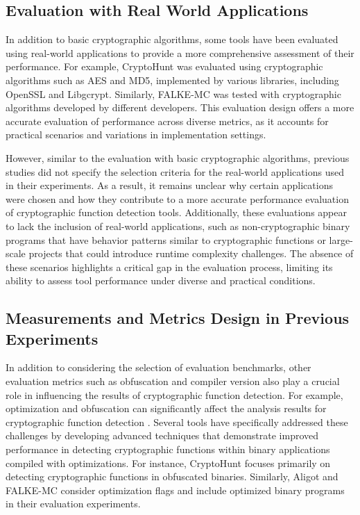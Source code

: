 \subsection{Evaluation with Real World Applications}
In addition to basic cryptographic algorithms, some tools have been evaluated using real-world applications to provide a more comprehensive assessment of their performance. For example, CryptoHunt was evaluated using cryptographic algorithms such as AES and MD5, implemented by various libraries, including OpenSSL and Libgcrypt. Similarly, FALKE-MC was tested with cryptographic algorithms developed by different developers. This evaluation design offers a more accurate evaluation of performance across diverse metrics, as it accounts for practical scenarios and variations in implementation settings.

However, similar to the evaluation with basic cryptographic algorithms, previous studies did not specify the selection criteria for the real-world applications used in their experiments. As a result, it remains unclear why certain applications were chosen and how they contribute to a more accurate performance evaluation of cryptographic function detection tools. Additionally, these evaluations appear to lack the inclusion of real-world applications, such as non-cryptographic binary programs that have behavior patterns similar to cryptographic functions or large-scale projects that could introduce runtime complexity challenges. The absence of these scenarios highlights a critical gap in the evaluation process, limiting its ability to assess tool performance under diverse and practical conditions.

\subsection{Measurements and Metrics Design in Previous Experiments}


In addition to considering the selection of evaluation benchmarks, other evaluation metrics such as obfuscation and compiler version also play a crucial role in influencing the results of cryptographic function detection. For example, optimization and obfuscation can significantly affect the analysis results for cryptographic function detection \cite{ren2021unleashing}. Several tools have specifically addressed these challenges by developing advanced techniques that demonstrate improved performance in detecting cryptographic functions within binary applications compiled with optimizations. For instance, CryptoHunt \cite{xu2017cryptographic} focuses primarily on detecting cryptographic functions in obfuscated binaries. Similarly, Aligot \cite{calvet2012aligot} and FALKE-MC \cite{benedetti2017detection} consider optimization flags and include optimized binary programs in their evaluation experiments.

